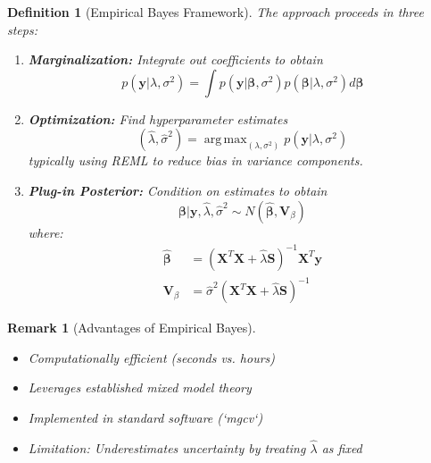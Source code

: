 \documentclass[12pt]{article}
\newtheorem{definition}{Definition}
\newtheorem{remark}{Remark}
\DeclareMathOperator*{\argmax}{arg\,max}
\begin{document}
\begin{definition}[Empirical Bayes Framework]
The approach proceeds in three steps:
\begin{enumerate}
    \item \textbf{Marginalization:} Integrate out coefficients to obtain
    \begin{equation}
    p(\mathbf{y}|\lambda, \sigma^2) = \int p(\mathbf{y}|\boldsymbol{\beta}, \sigma^2) p(\boldsymbol{\beta}|\lambda, \sigma^2) d\boldsymbol{\beta}
    \end{equation}
    
    \item \textbf{Optimization:} Find hyperparameter estimates
    \begin{equation}
    (\hat{\lambda}, \hat{\sigma}^2) = \argmax_{(\lambda, \sigma^2)} p(\mathbf{y}|\lambda, \sigma^2)
    \end{equation}
    typically using REML to reduce bias in variance components.
    
    \item \textbf{Plug-in Posterior:} Condition on estimates to obtain
    \begin{equation}
    \boldsymbol{\beta} | \mathbf{y}, \hat{\lambda}, \hat{\sigma}^2 \sim N(\hat{\boldsymbol{\beta}}, \mathbf{V}_{\beta})
    \end{equation}
    where:
    \begin{align}
    \hat{\boldsymbol{\beta}} &= (\mathbf{X}^T\mathbf{X} + \hat{\lambda}\mathbf{S})^{-1}\mathbf{X}^T\mathbf{y} \\
    \mathbf{V}_{\beta} &= \hat{\sigma}^2(\mathbf{X}^T\mathbf{X} + \hat{\lambda}\mathbf{S})^{-1}
    \end{align}
\end{enumerate}
\end{definition}

\begin{remark}[Advantages of Empirical Bayes]
\begin{itemize}
    \item Computationally efficient (seconds vs. hours)
    \item Leverages established mixed model theory
    \item Implemented in standard software (`mgcv`)
    \item Limitation: Underestimates uncertainty by treating $\hat{\lambda}$ as fixed
\end{itemize}
\end{remark}
\end{document}
